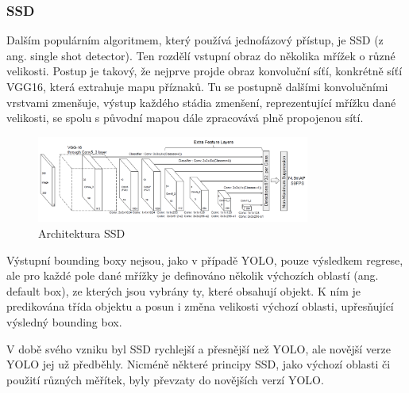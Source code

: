 \subsubsection{SSD}
Dalším populárním algoritmem, který používá jednofázový přístup, je SSD (z ang.
single shot detector). \cite{szegedy:ssd} Ten rozdělí vstupní obraz do několika
mřížek o různé velikosti. Postup je takový, že nejprve projde obraz konvoluční
síťí, konkrétně síťí VGG16, která extrahuje mapu příznaků. Tu se postupně
dalšími konvolučními vrstvami zmenšuje, výstup každého stádia zmenšení,
reprezentující mřížku dané velikosti, se spolu s původní mapou dále zpracovává
plně propojenou sítí.
\begin{figure}[]
    \centering
    \includegraphics[width=0.8\textwidth]{Figures/ssd.png}
    \caption{Architektura SSD \cite{szegedy:ssd}}
    \label{fig:ssd}
\end{figure}

Výstupní bounding boxy nejsou, jako v případě YOLO, pouze výsledkem regrese,
ale pro každé pole dané mřížky je definováno několik výchozích oblastí (ang.
default box), ze kterých jsou vybrány ty, které obsahují objekt. K ním je
predikována třída objektu a posun i změna velikosti výchozí oblasti,
upřesňující výsledný bounding box.

V době svého vzniku byl SSD rychlejší a přesnější než YOLO, ale novější verze
YOLO jej už předběhly. Nicméně některé principy SSD, jako výchozí oblasti či
použití různých měřítek, byly převzaty do novějších verzí YOLO.


\endinput